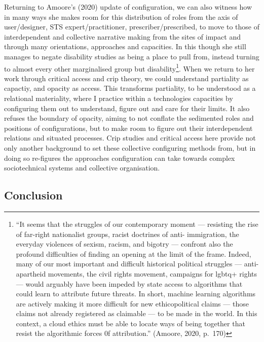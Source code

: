 Returning to Amoore's (2020) update of configuration, we can also
witness how in many ways she makes room for this distribution of roles
from the axis of user/designer, STS expert/practitioner,
prescriber/prescribed, to move to those of interdependent and collective
narrative making from the sites of impact and through many orientations,
approaches and capacities. In this though she still manages to negate
disability studies as being a place to pull from, instead turning to
almost every other marginalised group but disability\footnote{``It seems
  that the struggles of our contemporary moment --- resisting the rise
  of far-right nationalist groups, racist doctrines of anti-
  immigration, the everyday violences of sexism, racism, and bigotry ---
  confront also the profound difficulties of finding an opening at the
  limit of the frame. Indeed, many of our most important and difficult
  historical political struggles --- anti-apartheid movements, the civil
  rights movement, campaigns for lgbtq+ rights --- would arguably have
  been impeded by state access to algorithms that could learn to
  attribute future threats. In short, machine learning algorithms are
  actively making it more difficult for new ethicopolitical claims ---
  those claims not already registered as claimable --- to be made in the
  world. In this context, a cloud ethics must be able to locate ways of
  being together that resist the algorithmic forces 0f attribution.''
  (Amoore, 2020, p.~170)}. When we return to her work through critical
access and crip theory, we could understand partiality as capactiy, and
opacity as access. This transforms partiality, to be understood as a
relational materiality, where I practice within a technologies
capacities by configuring them out to understand, figure out and care
for their limits. It also refuses the boundary of opacity, aiming to not
conflate the sedimented roles and positions of configurations, but to
make room to figure out their interdependent relations and situated
processes. Crip studies and critical access here provide not only
another background to set these collective configuring methods from, but
in doing so re-figures the approaches configuration can take towards
complex sociotechnical systems and collective organisation.

\hypertarget{conclusion}{%
\subsection[Conclusion]{\texorpdfstring{\protect\hypertarget{anchor}{}{}Conclusion}{Conclusion}}\label{conclusion}}

